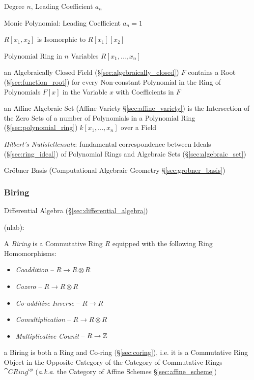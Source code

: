 Degree $n$, Leading Coefficient $a_n$

Monic Polynomial: Leading Coefficient $a_n = 1$

$R[x_1, x_2]$ is Isomorphic to $R[x_1][x_2]$

Polynomial Ring in $n$ Variables $R[x_1, \ldots, x_n]$

an Algebraically Closed Field (\S\ref{sec:algebraically_closed}) $F$ contains a
Root (\S\ref{sec:function_root}) for every Non-constant Polynomial in the Ring
of Polynomials $F[x]$ in the Variable $x$ with Coefficients in $F$

an Affine Algebraic Set (Affine Variety \S\ref{sec:affine_variety}) is the
Intersection of the Zero Sets of a number of Polynomials in a Polynomial Ring
(\S\ref{sec:polynomial_ring}) $k[x_1,\ldots,x_n]$ over a Field

\emph{Hilbert's Nullstellensatz}: fundamental correspondence between Ideals
(\S\ref{sec:ring_ideal}) of Polynomial Rings and Algebraic Sets
(\S\ref{sec:algebraic_set})

\fist Gr\"obner Basis (Computational Algebraic Geometry
\S\ref{sec:grobner_basis})



\subsubsection{Biring}\label{sec:biring}

\fist Differential Algebra (\S\ref{sec:differential_algebra})

(nlab):

A \emph{Biring} is a Commutative Ring $R$ equipped with the following Ring
Homomorphisms:
\begin{itemize}
  \item \emph{Coaddition} -- $R \rightarrow R \otimes R$
  \item \emph{Cozero} -- $R \rightarrow R \otimes R$
  \item \emph{Co-additive Inverse} -- $R \rightarrow R$
  \item \emph{Comultiplication} -- $R \rightarrow R \otimes R$
  \item \emph{Multiplicative Counit} -- $R \rightarrow \mathbb{Z}$
\end{itemize}

a Biring is both a Ring and Co-ring (\S\ref{sec:coring}), i.e. it is a
Commutative Ring Object in the Opposite Category of the Category of Commutative
Rings $\cat{CRing}^{op}$ (\emph{a.k.a.} the Category of Affine Schemes
\S\ref{sec:affine_scheme})



